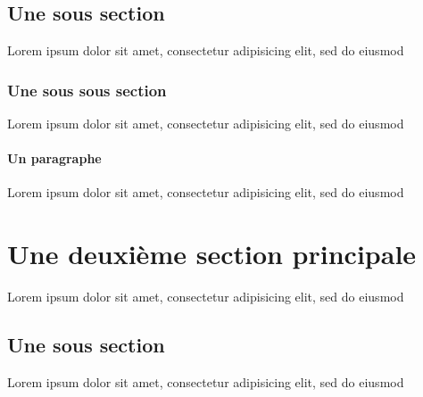\subsection{Une sous section}
Lorem ipsum dolor sit amet, consectetur adipisicing elit, sed do eiusmod

\subsubsection{Une sous sous section}
Lorem ipsum dolor sit amet, consectetur adipisicing elit, sed do eiusmod

\paragraph{Un paragraphe}
Lorem ipsum dolor sit amet, consectetur adipisicing elit, sed do eiusmod

\section{Une deuxième section principale}
Lorem ipsum dolor sit amet, consectetur adipisicing elit, sed do eiusmod

\subsection{Une sous section}
Lorem ipsum dolor sit amet, consectetur adipisicing elit, sed do eiusmod